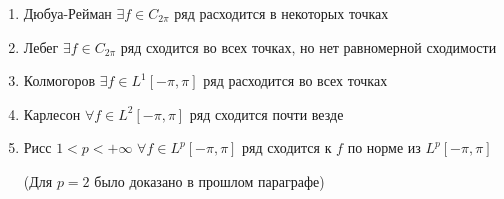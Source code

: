 \begin{enumerate}
    \item Дюбуа-Рейман $\exists f\in C_{2\pi}$ ряд расходится в некоторых точках
    \item Лебег $\exists f\in C_{2\pi}$ ряд сходится во всех точках, но нет равномерной сходимости
    \item Колмогоров $\exists f\in L^1[-\pi, \pi]$ ряд расходится во всех точках
    \item Карлесон $\forall f\in L^2[-\pi, \pi]$ ряд сходится почти везде
    \item Рисс $1 < p < +\infty$ $\forall f\in L^p[-\pi, \pi]$ ряд сходится к $f$ по норме из $L^p[-\pi, \pi]$

          (Для $p = 2$ было доказано в прошлом параграфе)
\end{enumerate}

